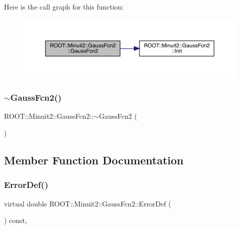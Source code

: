 Here is the call graph for this function\+:
\nopagebreak
\begin{figure}[H]
\begin{center}
\leavevmode
\includegraphics[width=350pt]{da/d5d/classROOT_1_1Minuit2_1_1GaussFcn2_a2904a79650d89e25591d84060e986271_cgraph}
\end{center}
\end{figure}
\mbox{\label{classROOT_1_1Minuit2_1_1GaussFcn2_ab37a15b9986eab678018570c2a744799}} 
\subsubsection{\texorpdfstring{$\sim$GaussFcn2()}{~GaussFcn2()}\hspace{0.1cm}{\footnotesize\ttfamily [2/2]}}
{\footnotesize\ttfamily R\+O\+O\+T\+::\+Minuit2\+::\+Gauss\+Fcn2\+::$\sim$\+Gauss\+Fcn2 (\begin{DoxyParamCaption}{ }\end{DoxyParamCaption})\hspace{0.3cm}{\ttfamily [inline]}}



\subsection{Member Function Documentation}
\mbox{\label{classROOT_1_1Minuit2_1_1GaussFcn2_ac240f7b6ecbb7bf842d786e3914c620a}} 
\subsubsection{\texorpdfstring{ErrorDef()}{ErrorDef()}\hspace{0.1cm}{\footnotesize\ttfamily [1/2]}}
{\footnotesize\ttfamily virtual double R\+O\+O\+T\+::\+Minuit2\+::\+Gauss\+Fcn2\+::\+Error\+Def (\begin{DoxyParamCaption}{ }\end{DoxyParamCaption}) const\hspace{0.3cm}{\ttfamily [inline]}, {\ttfamily [virtual]}}

